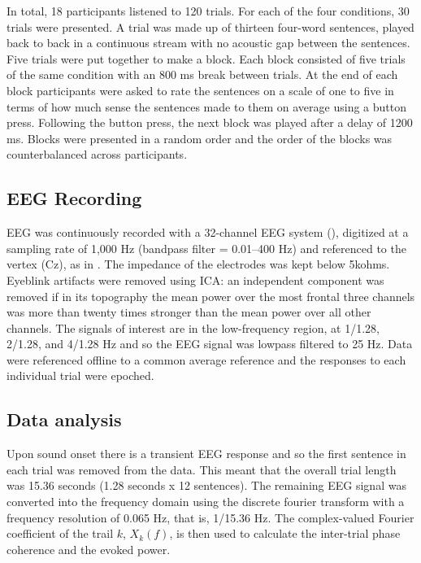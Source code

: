 \documentclass[10pt,letterpaper]{article}
\begin{document}
In total, 18 participants listened to 120 trials. For each of the four
conditions, 30 trials were presented. A trial was made up of thirteen
four-word sentences, played back to back in a continuous stream with
no acoustic gap between the sentences. Five trials were put together
to make a block. Each block consisted of five trials of the same
condition with an 800 ms break between trials. At the end of each
block participants were asked to rate the sentences on a scale of one
to five in terms of how much sense the sentences made to them on
average using a button press. Following the button press, the next
block was played after a delay of 1200 ms. Blocks were presented in a
random order and the order of the blocks was counterbalanced across
participants.

\subsection*{EEG Recording}

EEG was continuously recorded with a 32-channel EEG system (),
digitized at a sampling rate of 1,000 Hz (bandpass filter = 0.01–400
Hz) and referenced to the vertex (Cz), as in \cite{DingEtAl2017}. The
impedance of the electrodes was kept below 5kohms. Eyeblink artifacts were removed using ICA: an independent component
was removed if in its topography the mean power over the most frontal
three channels was more than twenty times stronger than the mean power
over all other channels. The signals of interest are in the
low-frequency region, at 1/1.28, 2/1.28, and 4/1.28 Hz and so the EEG
signal was lowpass filtered to 25 Hz. Data were referenced offline to
a common average reference and the responses to each individual trial
were epoched. 

\subsection*{Data analysis}

Upon sound onset there is a transient EEG response and
so the first sentence in each trial was removed from the data. This
meant that the overall trial length was 15.36 seconds (1.28 seconds x
12 sentences). The remaining EEG signal was converted into the frequency domain using the discrete
fourier transform with a frequency resolution of 0.065 Hz, that is, 1/15.36 Hz. The complex-valued Fourier coefficient of the trail $k$, $X_k(f)$, is then used to calculate the inter-trial phase coherence and the evoked power. 
\end{document}
